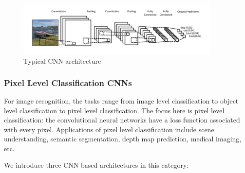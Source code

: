 \documentclass{article}
\begin{document}
\begin{figure}
    \centering
    \includegraphics[width=0.9\textwidth]{21/cnn.png}
    \caption{Typical CNN architecture}
    \label{fig:cnn}
\end{figure}

\subsubsection{Pixel Level Classification CNNs}

For image recognition, the tasks range from image level classification to object level classification to pixel level classification. The focus here is pixel level classification: the convolutional neural networks have a loss function associated with every pixel. Applications of pixel level classification include scene understanding, semantic segmentation, depth map prediction, medical imaging, etc.  

We introduce three CNN based architectures in this category: 
\end{document}
